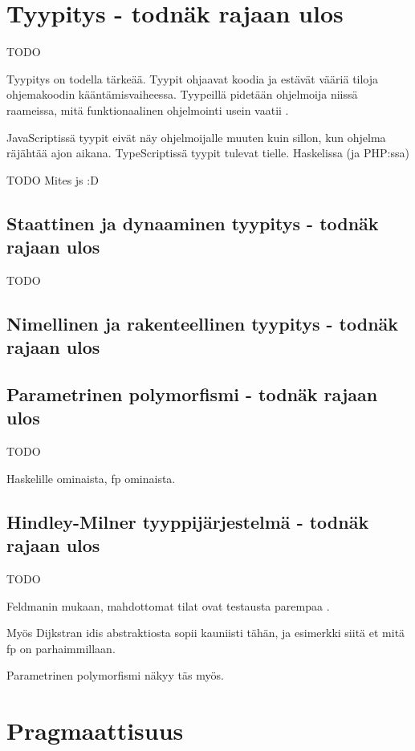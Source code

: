 \section{Tyypitys - todnäk rajaan ulos}

TODO

Tyypitys on todella tärkeää. Tyypit ohjaavat koodia ja estävät vääriä tiloja ohjemakoodin kääntämisvaiheessa. Tyypeillä pidetään ohjelmoija niissä raameissa, mitä funktionaalinen ohjelmointi usein vaatii \cite[44]{cantarella_fp_haitat}.

JavaScriptissä tyypit eivät näy ohjelmoijalle muuten kuin sillon, kun ohjelma räjähtää ajon aikana. TypeScriptissä tyypit tulevat tielle. Haskelissa (ja PHP:ssa)

TODO Mites \gls{js} :D

\subsection{Staattinen ja dynaaminen tyypitys - todnäk rajaan ulos}

TODO

\subsection{Nimellinen ja rakenteellinen tyypitys - todnäk rajaan ulos}


\subsection{Parametrinen polymorfismi - todnäk rajaan ulos}

TODO

Haskelille ominaista, fp ominaista.


\subsection{Hindley-Milner tyyppijärjestelmä - todnäk rajaan ulos}

TODO

Feldmanin mukaan, mahdottomat tilat ovat testausta parempaa \cite{impossiblebetter}.

Myös Dijkstran idis abstraktiosta sopii kauniisti tähän, ja esimerkki siitä et mitä fp on parhaimmillaan.

Parametrinen polymorfismi näkyy täs myös.


\section{Pragmaattisuus}

